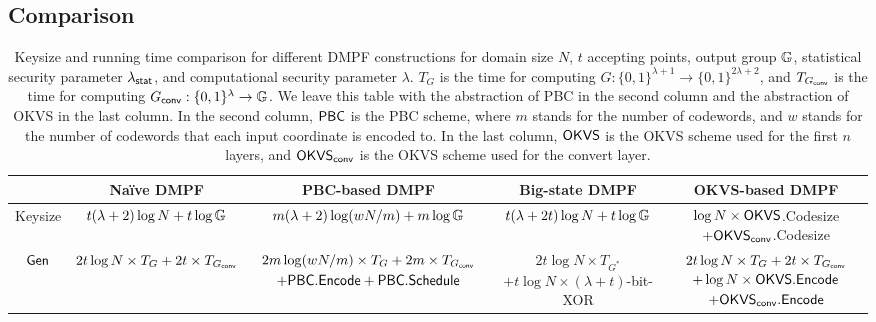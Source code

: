 \subsection{Comparison}\label{sec:DMPF_comparison}
\begin{table*}
    \renewcommand\arraystretch{1.5}
    \begin{threeparttable}
    \caption{Keysize and running time comparison for different DMPF constructions for domain size $N$, $t$ accepting points, output group $\mathbb{G}$, statistical security parameter $\lambda_{\sf stat}$, and computational security parameter $\lambda$. $T_G$ is the time for computing $G:\{0,1\}^{\lambda+1}\rightarrow \{0,1\}^{2\lambda+2}$, and $T_{G_{\sf conv}}$ is the time for computing $G_{\sf conv}:\{0,1\}^\lambda\rightarrow \mathbb{G}$. We leave this table with the abstraction of PBC in the second column and the abstraction of OKVS in the last column. In the second column, ${\sf PBC}$ is the PBC scheme, where $m$ stands for the number of codewords, and $w$ stands for the number of codewords that each input coordinate is encoded to. In the last column, ${\sf OKVS}$ is the OKVS scheme used for the first $n$ layers, and ${\sf OKVS}_{\sf conv}$ is the OKVS scheme used for the convert layer.  }
    \label{tab:formulas_DMPF_comparison}
    \begin{tabular}{ccccc}
        \toprule 
	&Na\"ive DMPF & PBC-based DMPF & Big-state DMPF & OKVS-based DMPF\\

        \midrule

	Keysize & $t(\lambda+2)\log N+t\log\mathbb{G}$ & $m(\lambda+2)\log(wN/m)+m\log\mathbb{G}$ & $t(\lambda+2t)\log N+t\log \mathbb{G}$ &\makecell{ $\log N\times{\sf OKVS}$.Codesize\\$+{\sf OKVS}_{\sf conv}$.Codesize}\\

        \cline{1-5}
				
	${\sf Gen}$ & $2t\log N\times T_G+2t\times T_{G_{\sf conv}}$ &\makecell{$2m\log(wN/m)\times T_G+2m\times T_{G_{\sf conv}}$\\$+{\sf PBC}.{\sf Encode}+{\sf PBC}.{\sf Schedule}$} &\makecell{$2t\log N\times T_{G^*}$\tnote{1}\\$+t\log N\times (\lambda+t)$-bit-XOR}
        & \makecell{$2t\log N\times T_G+2t\times T_{G_{\sf conv}}$\\$+\log N\times {\sf OKVS}.{\sf Encode}$\\$+ {\sf OKVS}_{\sf conv}.{\sf Encode}$} \\

        \cline{1-5}


\end{tabular}
\end{threeparttable}
\end{table*}
